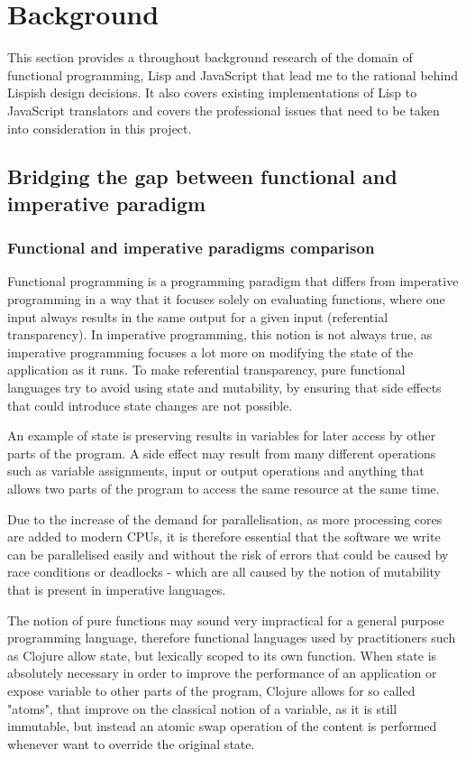 \chapter{Background}
This section provides a throughout background research of the domain of functional programming, Lisp and JavaScript that lead me to the rational behind Lispish design decisions. 
It also covers existing implementations of Lisp to JavaScript translators and covers the professional issues that need to be taken into consideration in this project. 

\section{Bridging the gap between functional and imperative paradigm}

\subsection{Functional and imperative paradigms comparison}
Functional programming is a programming paradigm that differs from imperative programming in a way that it focuses solely on evaluating functions, where one input always results in the same output for a given input (referential transparency). In imperative programming, this notion is not always true, as imperative programming focuses a lot more on modifying the state of the application as it runs. To make referential transparency, pure functional languages try to avoid using state and mutability, by ensuring that side effects that could introduce state changes are not possible.

An example of state is preserving results in variables for later access by other parts of the program. A side effect may result from many different operations such as variable assignments, input or output operations and anything that allows two parts of the program to access the same resource at the same time.

Due to the increase of the demand for parallelisation, as more processing cores are added to modern CPUs, it is therefore essential that the software we write can be parallelised easily and without the risk of errors that could be caused by race conditions or deadlocks - which are all caused by the notion of mutability that is present in imperative languages.

The notion of pure functions may sound very impractical for a general purpose programming language, therefore functional languages used by practitioners such as Clojure allow state, but lexically scoped to its own function.
When state is absolutely necessary in order to improve the performance of an application or expose variable to other parts of the program, Clojure allows for so called "atoms", that improve on the classical notion of a variable, as it is still immutable, but instead an atomic swap operation of the content is performed whenever want to override the original state.

